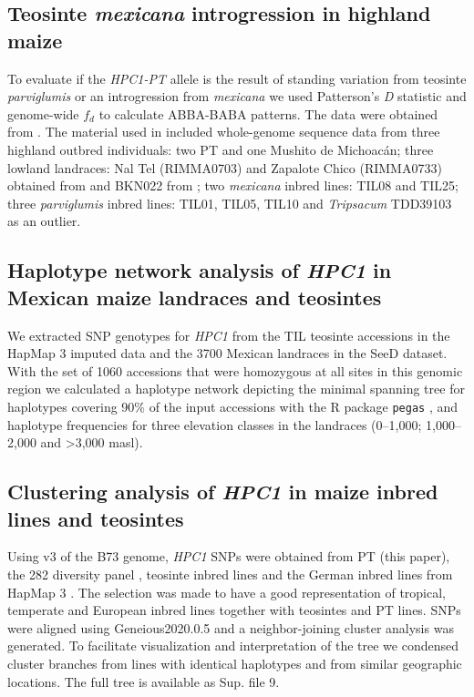 \documentclass[9pt,twocolumn,twoside,lineno]{biorxiv}
\def\code#1{\texttt{#1}}
\newcommand{\mex}{\textit{mexicana}\xspace}
\newcommand{\hpc}{\textit{HPC1}\xspace}
\newcommand{\parv}{\textit{parviglumis}\xspace}
\begin{document}
\subsection{Teosinte \mex introgression in highland maize}
To evaluate if the \textit{HPC1-PT} allele is the result of standing variation from teosinte \parv or an introgression from \mex we used Patterson's \textit{D} \cite{Patterson2012-sw} statistic and genome-wide $f_{d}$ \cite{Martin2015-ee} to calculate ABBA-BABA patterns. 
The data were obtained from \cite{Gonzalez-Segovia2019-jy}. 
The material used in \cite{Gonzalez-Segovia2019-jy} included whole-genome sequence data from three highland outbred individuals: two PT and one Mushito de Michoacán; three lowland landraces: Nal Tel (RIMMA0703) and Zapalote Chico (RIMMA0733) obtained from \cite{Wang2017-bc} and  BKN022 from \cite{Bukowski2017-ng}; two \mex inbred lines: TIL08 and TIL25; three \parv inbred lines: TIL01, TIL05, TIL10 and \textit{Tripsacum} TDD39103 \cite{Bukowski2017-ng} as an outlier. 
\subsection{Haplotype network analysis of \hpc in Mexican maize landraces and teosintes}
We extracted SNP genotypes for \hpc from the TIL teosinte accessions in the HapMap 3 imputed data \cite{Bukowski2017-ng} and the 3700 Mexican landraces in the SeeD dataset. 
With the set of 1060 accessions that were homozygous at all sites in this genomic region we calculated a haplotype network depicting the minimal spanning tree for haplotypes covering 90\% of the input accessions with the R package \code{pegas} \cite{paradis2010}, and haplotype frequencies for three elevation classes in the landraces (0--1,000; 1,000--2,000 and >3,000 masl).
\subsection{Clustering analysis of \hpc in maize inbred lines and teosintes}
Using v3 of the B73 genome, \hpc SNPs were obtained from PT (this paper), the 282 diversity panel \cite{Flint-Garcia2005-hb}, teosinte inbred lines and the German inbred lines from HapMap 3 \cite{Bukowski2017-ng}. 
The selection was made to have a good representation of tropical, temperate and European inbred lines together with teosintes and PT lines.
SNPs were aligned using Geneious2020.0.5 and a neighbor-joining cluster analysis was generated. 
To facilitate visualization and interpretation of the tree we condensed cluster branches from lines with identical haplotypes and from similar geographic locations. 
The full tree is available as Sup. file 9. 
\end{document}
